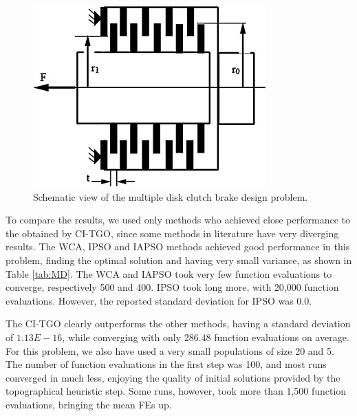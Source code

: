 \begin{figure}[h]
\begin{center}
\includegraphics[scale=0.6]{Imgs/MD.jpg}
\end{center}
\captionsetup{justification=centering}
\caption{Schematic view of the multiple disk clutch brake design problem.}\label{fig:MD}
\end{figure}

To compare the results, we used only methods who achieved close performance to the obtained by CI-TGO, since some methods in literature have very diverging results. The WCA, IPSO and IAPSO methods achieved good performance in this problem, finding the optimal solution and having very small variance, as shown in Table \ref{tab:MD}. The WCA and IAPSO took very few function evaluations to converge, respectively 500 and 400. IPSO took long more, with 20,000 function evaluations. However, the reported standard deviation for IPSO was 0.0.



The CI-TGO clearly outperforms the other methods, having a standard deviation of $1.13E-16$, while converging with only 286.48 function evaluations on average. For this problem, we also have used a very small populations of size 20 and 5. The number of function evaluations in the first step was 100, and most runs converged in much less, enjoying the quality of initial solutions provided by the topographical heuristic step. Some runs, however, took more than 1,500 function evaluations, bringing the mean FEs up.

